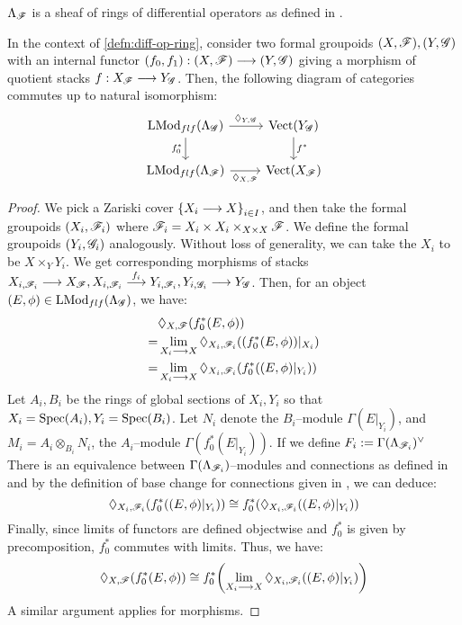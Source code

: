 \documentclass[11pt]{amsart}
\begin{document}
\begin{rmk}
$\Lambda_\mathscr{F}$ is a sheaf of rings of differential operators as defined in
\cite[\S 2]{ModRepFunGrpI}.
\end{rmk}

\begin{prop}\label{prop:cryst-pullback-compat}
In the context of \cref{defn:diff-op-ring}, consider two formal groupoids
$(X, \mathscr{F}), (Y, \mathscr{G})$ with an internal functor
$(f_0, f_1) : (X, \sF) \to (Y, \sG)$ giving a morphism of quotient stacks
$f : X_\sF \to Y_\sG$.
Then, the following diagram of categories commutes up to natural isomorphism:
\[\begin{tikzcd}
\LMod_{flf}(\Lambda_\sG) \ar[r, "\Diamond_{Y, \sG}"] \ar[d, "f_0^*" left] &
\Vect(Y_\sG) \ar[d, "f^*"] \\
\LMod_{flf}(\Lambda_\sF) \ar[r, "\Diamond_{X, \sF}" below] &
\Vect(X_\sF)
\end{tikzcd}\]
\end{prop}
\begin{proof}
We pick a Zariski cover $\set{X_i \to X}_{i \in I}$, and then take
the formal groupoids $(X_i, \mathscr{F}_i)$ where
$\mathscr{F}_i = X_i \times X_i \times_{X \times X} \mathscr{F}$. We define
the formal groupoids $(Y_i, \mathscr{G}_i)$ analogously.
Without loss of generality, we can take the $X_i$ to be $X \times_Y Y_i$.
We get corresponding morphisms of stacks
$X_{i, \sF_i} \to X_\sF, X_{i, \sF_i} \to[f_i] Y_{i, \sF_i},
Y_{i, \sG_i} \to Y_{\sG}$.
Then, for an object $(E, \phi) \in \mathrm{LMod}_{flf}(\Lambda_\mathscr{G})$, we have:
\begin{align*}
& \Diamond_{X, \sF}(f_0^*(E, \phi)) \\
=& \lim_{X_i \to X} \Diamond_{X_i, \sF_i}((f_0^*(E, \phi))|_{X_i}) \\
=& \lim_{X_i \to X} \Diamond_{X_i, \sF_i}(f_0^*((E, \phi)|_{Y_i}))
\end{align*}
Let $A_i, B_i$ be the rings of global sections of $X_i, Y_i$ so that
$X_i = \mathrm{Spec}(A_i), Y_i = \mathrm{Spec}(B_i)$.
Let $N_i$ denote the $B_i$--module $\Gamma(E|_{Y_i})$, and
$M_i = A_i \otimes_{B_i} N_i$, the $A_i$--module $\Gamma(f^*_0(E|_{Y_i}))$.
If we define
$F_i := \Gamma(\Lambda_{\mathscr{F}_i})^\vee$
There is an equivalence
\cite[\S 3.5]{GeomNonAbHodgeFilt} between
$\Gamma(\Lambda_{\mathscr{F}_i})$--modules and connections as defined
in \cite[\S II.1.2]{CohomCrysCharP} and
by the definition of base change for connections given in
\cite[94, \S II.1.2.5]{CohomCrysCharP}, we can deduce:
\[
\Diamond_{X_i, \sF_i}(f^*_0((E, \phi)|_{Y_i}))
\cong f^*_0\br{\Diamond_{X_i, \sF_i}\br{\br{E, \phi}|_{Y_i}}}
\]
Finally, since limits of functors are defined objectwise and $f^*_0$
is given by precomposition, $f^*_0$ commutes with limits. Thus, we have:
\[
\Diamond_{X, \sF}(f_0^*(E, \phi))
\cong f_0^*\br{\lim_{X_i \to X} \Diamond_{X_i, \sF_i}((E, \phi)|_{Y_i})}
\]
A similar argument applies for morphisms.
\end{proof}
\end{document}
